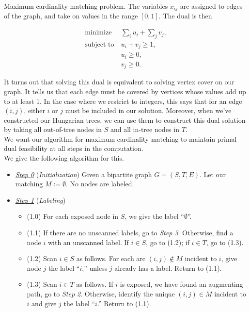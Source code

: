 \documentclass[11pt]{article}
\renewcommand{\'}{^{'}}
\begin{document}
\begin{section}{Maximum cardinality matching problem.}
The variables $x_{ij}$ are assigned to edges of the graph, and take on values in the 
range $[0,1]$. The dual is then 

\begin{align*}
	\text{minimize}\ &\sum_i u_i + \sum_j v_j,\\
	\text{subject to}\ &u_i + v_j \geq 1,\\
	                   &u_i \geq 0,\\
			   &v_j \geq 0.
\end{align*}

It turns out that solving this dual is equivalent to solving vertex cover on our graph. 
It tells us that each edge must be covered by vertices whose values add up to at least 1. 
In the case where we restrict to integers, this says that for an edge $(i,j)$, 
either $i$ or $j$ must be included in our solution. Moreover, when we've constructed our Hungarian 
trees, we can use them to construct this dual solution by taking all out-of-tree nodes in $S$ and 
all in-tree nodes in $T$.\\
We want our algorithm for maximum cardinality matching to maintain primal dual feasibility at 
all steps in the computation. 
\\
We give the following algorithm for this. 
\begin{itemize}
	\item \underline{\emph{Step 0}} (\emph{Initialization}) Given a bipartite 
		graph $G=(S,T,E)$. Let our matching $M := \emptyset$. No nodes are labeled.
	\item \underline{\emph{Step 1}} (\emph{Labeling})
		\begin{itemize}
			\item (1.0) For each exposed node in $S$, we give the label 
				``$\emptyset$''.
			\item (1.1) If there are no unscanned labels, go to \emph{Step 3}. 
				Otherwise, find a node $i$ with an unscanned label. If 
				$i\in S$, go to (1.2); if $i\in T$, go to (1.3).
			\item (1.2) Scan $i\in S$ as follows. For each arc $(i,j)\notin M$ 
				incident to $i$, give node $j$ the label ``$i$,'' unless 
				$j$ already has a label. Return to (1.1).
			\item (1.3) Scan $i\in T$ as follows. If $i$ is exposed, we have 
				found an augmenting path, go to \emph{Step 2}. Otherwise, 
				identify the unique $(i,j)\in M$ incident to $i$ and give 
				$j$ the label ``$i$.'' Return to (1.1).
		\end{itemize}

\end{itemize}
\end{section}
\end{document}
